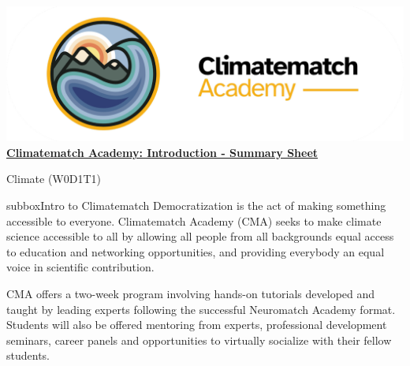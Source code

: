 \includegraphics[scale=0.06]{Figures/CMA.png}\href{https://compneuro.neuromatch.io/tutorials/intro.html}{\textbf{\Huge{Climatematch Academy: Introduction - Summary Sheet}}}
\small
\begin{multicols}{3}
\begin{textbox}{Climate (W0D1T1) }
\begin{subbox}{subbox}{Intro to Climatematch }
\scriptsize
Democratization is the act of making something accessible to everyone. Climatematch Academy (CMA) seeks to make climate science accessible to all by allowing all people from all backgrounds equal access to education and networking opportunities, and providing everybody an equal voice in scientific contribution. 

CMA offers a two-week program involving hands-on tutorials developed and taught by leading experts following the successful Neuromatch Academy format. Students will also be offered mentoring from experts, professional development seminars, career panels and opportunities to virtually socialize with their fellow students.


\end{subbox}

\end{textbox}
\end{multicols}